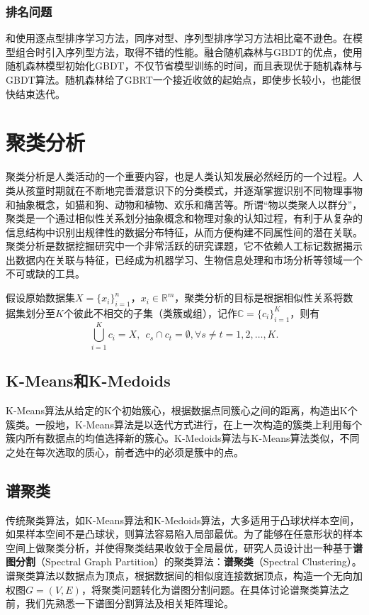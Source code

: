\subsection{排名问题}
\cite{busa2011ranking}和\cite{mohan2011web}使用逐点型排序学习方法，同序对型、序列型排序学习方法相比毫不逊色。\cite{busa2011ranking}在模型组合时引入序列型方法，取得不错的性能。\cite{mohan2011web}融合随机森林与GBDT的优点，使用随机森林模型初始化GBDT，不仅节省模型训练的时间，而且表现优于随机森林与GBDT算法。随机森林给了GBRT一个接近收敛的起始点，即使步长较小，也能很快结束迭代。

\chapter{聚类分析}
聚类分析是人类活动的一个重要内容，也是人类认知发展必然经历的一个过程。人类从孩童时期就在不断地完善潜意识下的分类模式，并逐渐掌握识别不同物理事物和抽象概念，如猫和狗、动物和植物、欢乐和痛苦等。所谓“物以类聚人以群分”，聚类是一个通过相似性关系划分抽象概念和物理对象的认知过程，有利于从复杂的信息结构中识别出规律性的数据分布特征，从而方便构建不同属性间的潜在关联。聚类分析是数据挖掘研究中一个非常活跃的研究课题，它不依赖人工标记数据揭示出数据内在关联与特征，已经成为机器学习、生物信息处理和市场分析等领域一个不可或缺的工具。

假设原始数据集$X=\{x_i\}_{i=1}^n$，$x_i\in \mathbb R^m$，聚类分析的目标是根据相似性关系将数据集划分至$K$个彼此不相交的子集（类簇或组），记作$\mathbb C=\{c_i\}_{i=1}^K$，则有
\[
    \bigcup\limits_{i=1}^K c_i = X,~~ c_s \cap c_t = \emptyset, \forall s\ne t = 1, 2,\ldots,K.
\]

\section{K-Means和K-Medoids}
K-Means算法从给定的K个初始簇心，根据数据点同簇心之间的距离，构造出K个簇类。一般地，K-Means算法是以迭代方式进行，在上一次构造的簇类上利用每个簇内所有数据点的均值选择新的簇心。K-Medoids算法与K-Means算法类似，不同之处在每次选取的质心，前者选中的必须是簇中的点。

\section{谱聚类}
传统聚类算法，如K-Means算法和K-Medoids算法，大多适用于凸球状样本空间，如果样本空间不是凸球状，则算法容易陷入局部最优。为了能够在任意形状的样本空间上做聚类分析，并使得聚类结果收敛于全局最优，研究人员设计出一种基于\textbf{谱图分割}（Spectral Graph Partition）的聚类算法：\textbf{谱聚类}（Spectral Clustering）。谱聚类算法以数据点为顶点，根据数据间的相似度连接数据顶点，构造一个无向加权图$G=(V, E)$，将聚类问题转化为谱图分割问题。在具体讨论谱聚类算法之前，我们先熟悉一下谱图分割算法及相关矩阵理论。

